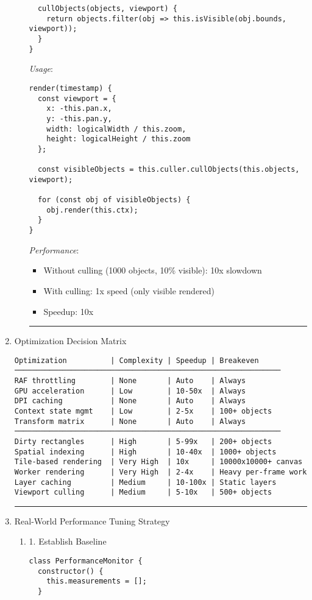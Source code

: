 \documentclass[11pt]{article}
\begin{document}
\begin{enumerate}
\begin{enumerate}
\begin{verbatim}
  cullObjects(objects, viewport) {
    return objects.filter(obj => this.isVisible(obj.bounds, viewport));
  }
}
\end{verbatim}

\emph{Usage}:
\begin{verbatim}
render(timestamp) {
  const viewport = {
    x: -this.pan.x,
    y: -this.pan.y,
    width: logicalWidth / this.zoom,
    height: logicalHeight / this.zoom
  };
  
  const visibleObjects = this.culler.cullObjects(this.objects, viewport);
  
  for (const obj of visibleObjects) {
    obj.render(this.ctx);
  }
}
\end{verbatim}

\emph{Performance}:
\begin{itemize}
\item Without culling (1000 objects, 10\% visible): 10x slowdown
\item With culling: 1x speed (only visible rendered)
\item Speedup: 10x
\end{itemize}

\noindent\rule{\textwidth}{0.5pt}
\end{enumerate}
\item Optimization Decision Matrix
\label{sec:org8aca76a}

\begin{verbatim}
Optimization          | Complexity | Speedup | Breakeven
─────────────────────────────────────────────────────────────
RAF throttling        | None       | Auto    | Always
GPU acceleration      | Low        | 10-50x  | Always
DPI caching           | None       | Auto    | Always
Context state mgmt    | Low        | 2-5x    | 100+ objects
Transform matrix      | None       | Auto    | Always
─────────────────────────────────────────────────────────────
Dirty rectangles      | High       | 5-99x   | 200+ objects
Spatial indexing      | High       | 10-40x  | 1000+ objects
Tile-based rendering  | Very High  | 10x     | 10000x10000+ canvas
Worker rendering      | Very High  | 2-4x    | Heavy per-frame work
Layer caching         | Medium     | 10-100x | Static layers
Viewport culling      | Medium     | 5-10x   | 500+ objects
\end{verbatim}

\noindent\rule{\textwidth}{0.5pt}
\item Real-World Performance Tuning Strategy
\label{sec:org9ed40c0}

\begin{enumerate}
\item 1. Establish Baseline
\label{sec:orgcb608e3}
\begin{verbatim}
class PerformanceMonitor {
  constructor() {
    this.measurements = [];
  }
  

\end{verbatim}
\end{enumerate}
\end{enumerate}
\end{document}
